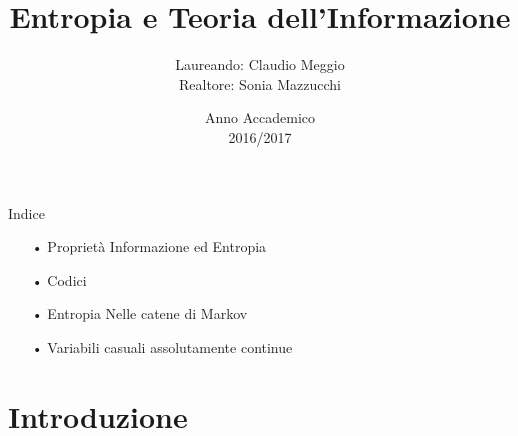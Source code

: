 \documentclass{beamer}
\theoremstyle{definition}
\numberwithin{equation}{section}
\newcommand{\spacep}{$(\Omega,\mathcal{F} ,\mathbb{P})$}
\begin{document}
\title{Entropia e Teoria dell'Informazione}
\author{Laureando: Claudio Meggio\\ Realtore: Sonia Mazzucchi}
\date{Anno Accademico\\2016/2017}



\begin{frame}
\titlepage 
\end{frame}


\begin{frame}[t]{Indice}
\vspace{40pt}
\begin{enumerate}
\item[•] Proprietà Informazione ed Entropia
\item[•] Codici
\item[•] Entropia Nelle catene di Markov
\item[•] Variabili casuali assolutamente continue
\end{enumerate}
\end{frame}


\section{Introduzione}



\end{document}
